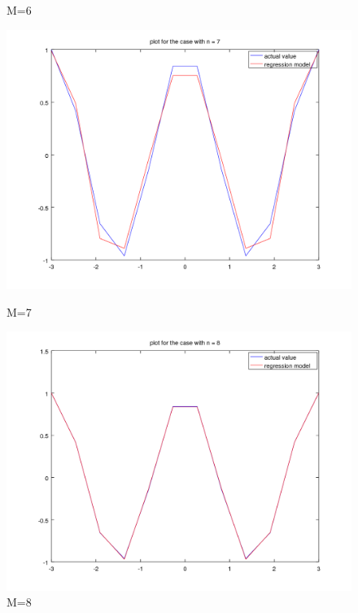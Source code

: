\documentclass[11pt]{article}
\theoremstyle{plain}
\theoremstyle{definition}
\begin{document}
\begin{figure}[!htb]
\begin {minipage}{0.48\textwidth}
     \caption{M=6}\label{Fig:M=6}
   \end{minipage}\hfill
   \begin{minipage}{0.48\textwidth}
     \centering
     \includegraphics[width=.7\linewidth]{hw1_task6_fig7.png}
     \caption{M=7}\label{Fig:M=7}
   \end{minipage}\hfill
   \begin {minipage}{0.48\textwidth}
     \centering
     \includegraphics[width=.7\linewidth]{hw1_task6_fig8.png}
     \caption{M=8}\label{Fig:M=8}
   \end{minipage}
\end{figure} 
\end{document}

